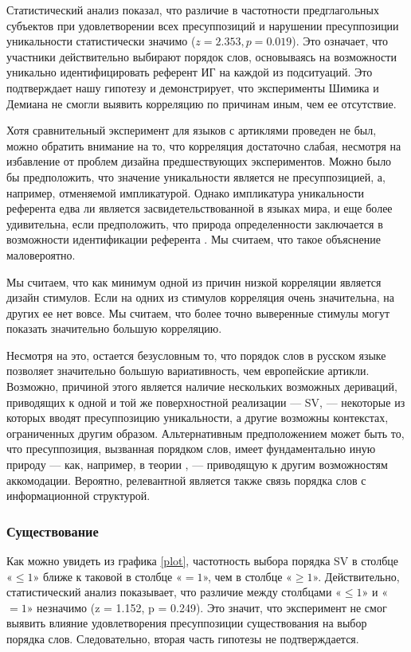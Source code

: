 \documentclass[a4paper, 12pt]{article}
\begin{document}
Статистический анализ показал, что различие в частотности предглагольных субъектов при удовлетворении всех пресуппозиций и нарушении пресуппозиции уникальности статистически значимо ($z = 2.353, p = 0.019$). Это означает, что участники действительно выбирают порядок слов, основываясь на возможности уникально идентифицировать референт ИГ на каждой из подситуаций. Это подтверждает нашу гипотезу и демонстрирует, что эксперименты Шимика и Демиана не смогли выявить корреляцию по причинам иным, чем ее отсутствие.

Хотя сравнительный эксперимент для языков с артиклями проведен не был, можно обратить внимание на то, что корреляция достаточно слабая, несмотря на избавление от проблем дизайна предшествующих экспериментов. Можно было бы предположить, что значение уникальности является не пресуппозицией, а, например, отменяемой импликатурой. Однако импликатура уникальности референта едва ли является засвидетельствованной в языках мира, и еще более удивительна, если предположить, что природа определенности заключается в возможности идентификации референта \parencite[напр.][]{roberts2003uniquenessdefinitenoun}. Мы считаем, что такое объяснение маловероятно.

Мы считаем, что как минимум одной из причин низкой корреляции является дизайн стимулов. Если на одних из стимулов корреляция очень значительна, на других ее нет вовсе. Мы считаем, что более точно выверенные стимулы могут показать значительно большую корреляцию.

Несмотря на это, остается безусловным то, что порядок слов в русском языке позволяет значительно большую вариативность, чем европейские артикли. Возможно, причиной этого является наличие нескольких возможных дериваций, приводящих к одной и той же поверхностной реализации — SV, — некоторые из которых вводят пресуппозицию уникальности, а другие возможны контекстах, ограниченных другим образом. Альтернативным предположением может быть то, что пресуппозиция, вызванная порядком слов, имеет фундаментально иную природу — как, например, в теории \parencite{simik2021inherentvsaccidental}, — приводящую к другим возможностям аккомодации. Вероятно, релевантной является также связь порядка слов с информационной структурой.

\subsubsection{Существование}

Как можно увидеть из графика \ref{plot}, частотность выбора порядка SV в столбце «$\le1$» ближе к таковой в столбце «$=1$», чем в столбце «$\ge 1$». Действительно, статистический анализ показывает, что различие между столбцами «$\le1$» и «$=1$» незначимо (z = 1.152, p = 0.249). Это значит, что эксперимент не смог выявить влияние удовлетворения пресуппозиции существования на выбор порядка слов. Следовательно, вторая часть гипотезы не подтверждается.
\end{document}
